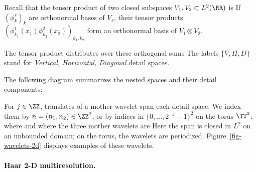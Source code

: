 Recall that the tensor product of two closed subspaces $V_1,V_2\subset L^2(\RR)$ is
If $(\phi_k^s)_k$ are orthonormal bases of $V_s$, their tensor products $(\phi_{k_1}^1(x_1)\phi_{k_2}^2(x_2))_{k_1,k_2}$ form an orthonormal basis of $V_1 \otimes V_2$.

The tensor product distributes over these orthogonal sums
The labels $\{V,H,D\}$ stand for \textit{Vertical, Horizontal, Diagonal} detail spaces.
 
The following diagram summarizes the nested spaces and their detail components:
\begin{center}
\end{center}

For $j \in \ZZ$, translates of a mother wavelet span each detail space. We index them by $n=(n_1,n_2)\in\ZZ^2$, or by indices in $\{0,\ldots,2^{-j}-1\}^2$ on the torus $\TT^2$:
where
and where the three mother wavelets are
Here the span is closed in $L^2$ on an unbounded domain; on the torus, the wavelets are periodized. Figure~\ref{fig-wavelets-2d} displays examples of these wavelets.



  
\paragraph{Haar 2-D multiresolution.}

